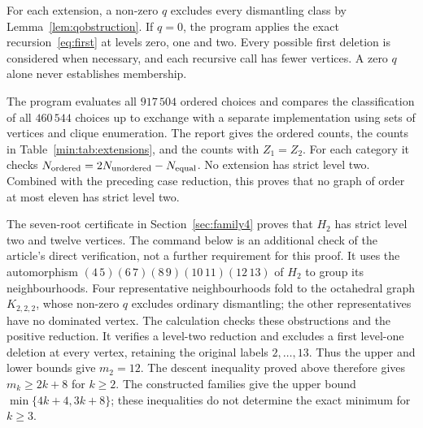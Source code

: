 For each extension, a non-zero $q$ excludes every dismantling class by
Lemma~\ref{lem:qobstruction}. If $q=0$, the program applies the exact
recursion~\eqref{eq:first} at levels zero, one and two. Every possible first
deletion is considered when necessary, and each recursive call has fewer
vertices. A zero $q$ alone never establishes membership.
\begin{table}[htbp]
\centering\small
\caption{The $65\,792$ extension choices per seed, after exchanging the two
external vertices. The four columns partition the choices; the last column
has $q=0$ and lies outside $\D_2$.}\label{min:tab:extensions}

\end{table}
The program evaluates all $917\,504$ ordered choices and compares the
classification of all $460\,544$ choices up to exchange with a separate
implementation using sets of vertices and clique enumeration. The report gives the
ordered counts, the counts in Table~\ref{min:tab:extensions}, and the counts
with $Z_1=Z_2$. For each category it checks
$N_{\rm ordered}=2N_{\rm unordered}-N_{\rm equal}$.
No extension has strict level two. Combined with the preceding case
reduction, this proves that no graph of order at most eleven has strict level two.

The seven-root certificate in Section~\ref{sec:family4} proves that $H_2$
has strict level two and twelve vertices. The command below is an additional
check of the article's direct verification, not a further requirement for
this proof. It uses the automorphism
$(4\,5)(6\,7)(8\,9)(10\,11)(12\,13)$ of $H_2$ to group its neighbourhoods.
Four representative neighbourhoods fold to the octahedral graph
$K_{2,2,2}$, whose non-zero $q$ excludes ordinary dismantling; the other
representatives have no dominated vertex. The calculation checks these
obstructions and the positive reduction.
It verifies a level-two reduction and excludes a first level-one deletion
at every vertex, retaining the original labels $2,\ldots,13$.
Thus the upper and lower bounds give $m_2=12$.
The descent inequality proved above therefore gives $m_k\geq2k+8$
for $k\geq2$. The constructed families give
the upper bound $\min\{4k+4,3k+8\}$; these inequalities do not determine
the exact minimum for $k\geq3$.

